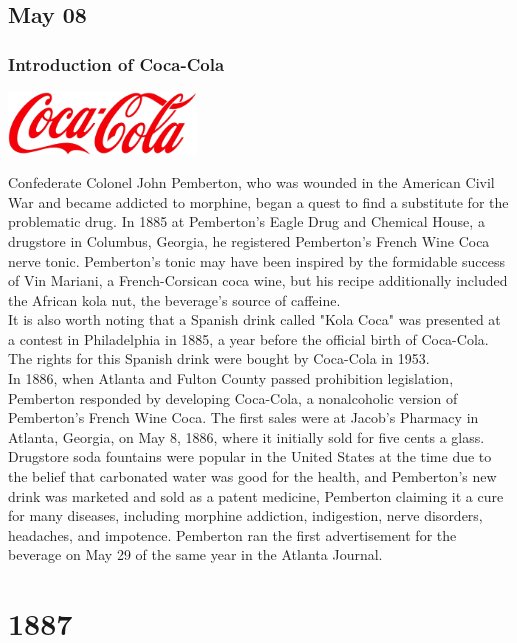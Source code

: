 \documentclass[11pt]{report}
\begin{document}
\section{May 08}
\subsection{Introduction of Coca-Cola}
\vspace{2mm}\begin{center}\includegraphics[width=5cm]{./img/cocacolaLogo.jpg}\end{center}
Confederate Colonel John Pemberton, who was wounded in the American Civil War and became addicted to morphine, began a quest to find a substitute for the problematic drug. In 1885 at Pemberton's Eagle Drug and Chemical House, a drugstore in Columbus, Georgia, he registered Pemberton's French Wine Coca nerve tonic. Pemberton's tonic may have been inspired by the formidable success of Vin Mariani, a French-Corsican coca wine, but his recipe additionally included the African kola nut, the beverage's source of caffeine.\\ \indent It is also worth noting that a Spanish drink called "Kola Coca" was presented at a contest in Philadelphia in 1885, a year before the official birth of Coca-Cola. The rights for this Spanish drink were bought by Coca-Cola in 1953.\\ \indent In 1886, when Atlanta and Fulton County passed prohibition legislation, Pemberton responded by developing Coca-Cola, a nonalcoholic version of Pemberton's French Wine Coca. The first sales were at Jacob's Pharmacy in Atlanta, Georgia, on May 8, 1886, where it initially sold for five cents a glass. Drugstore soda fountains were popular in the United States at the time due to the belief that carbonated water was good for the health, and Pemberton's new drink was marketed and sold as a patent medicine, Pemberton claiming it a cure for many diseases, including morphine addiction, indigestion, nerve disorders, headaches, and impotence. Pemberton ran the first advertisement for the beverage on May 29 of the same year in the Atlanta Journal.

\chapter{1887}
\end{document}

